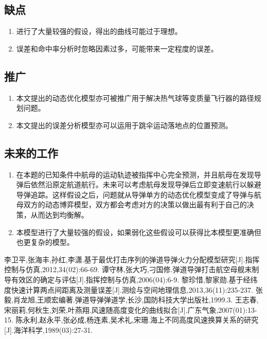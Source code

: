 \documentclass[UTF8]{article}
\begin{document}
\subsection{缺点}
\begin{enumerate}[1]
\item 进行了大量较强的假设，得出的曲线可能过于理想。
\item 误差和命中率分析时忽略因素过多，可能带来一定程度的误差。
\end{enumerate}

\subsection{推广}
\begin{enumerate}[1]
\item 本文提出的动态优化模型亦可被推广用于解决热气球等变质量飞行器的路径规划问题。
\item 本文提出的误差分析模型亦可以运用于跳伞运动落地点的位置预测。
\end{enumerate}

\subsection{未来的工作}
\begin{enumerate}[1]
\item 在本题的已知条件中航母的运动轨迹被指挥中心完全预测，并且航母在发现导弹后依然沿原定航道航行。未来可以考虑航母发现导弹后立即变速航行以躲避导弹追踪。这样假设之后，问题就从导弹单方的动态优化模型变成了导弹与航母双方的动态博弈模型，双方都会考虑对方的决策以做出最有利于自己的决策，从而达到均衡解。
\item 本模型进行了大量较强的假设，如果弱化这些假设可以获得比本模型更准确但也更复杂的模型。
\end{enumerate}

\newpage
\begin{thebibliography}{}
\label{1}李卫平,张海丰,孙红,李潇.基于最优打击序列的弹道导弹火力分配模型研究[J].指挥控制与仿真,2012,34(02):66-69.
\label{2}谭守林,张大巧,刁国修.弹道导弹打击航空母舰末制导有效区的确定与评估[J].指挥控制与仿真,2006(04):6-9.
\label{3}黎珍惜,黎家勋.基于经纬度快速计算两点间距离及测量误差[J].测绘与空间地理信息,2013,36(11):235-237.
\label{4}张毅,肖龙旭,王顺宏编著.弹道导弹弹道学,长沙,国防科技大学出版社,1999.3.
\label{5}王志春,宋丽莉,何秋生,刘荣,叶燕翔.风速随高度变化的曲线拟合[J].广东气象,2007(01):13-15.
\label{6}陈永利,赵永平,张必成,杨连素,吴术礼,宋珊.海上不同高度风速换算关系的研究[J].海洋科学,1989(03):27-31.
\end{thebibliography}
\end{document}
